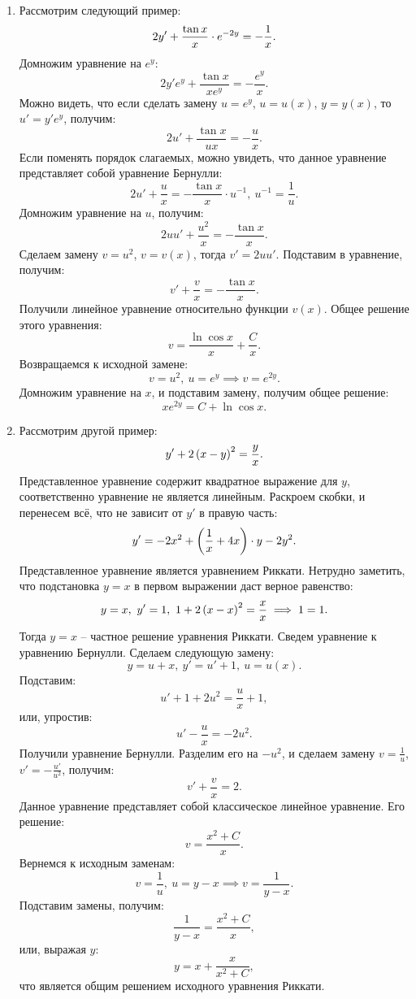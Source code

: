 		\begin{enumerate}
			\item Рассмотрим следующий пример:
				\[ 2y' + \frac{\tan{x}}{x} \cdot e^{-2y} = - \dfrac{1}{x}. \]
				Домножим уравнение на $e^{y}$:
				\[ 2y' e^{y} + \frac{\tan{x}}{x e^{y}} = - \frac{e^{y}}{x}. \]
				Можно видеть, что если сделать замену $u = e^{y}$, $u = u(x)$, $y = y(x)$, то $u' = y' e^{y}$, получим:
				\[ 2u' + \frac{\tan{x}}{ux} = - \frac{u}{x}. \]
				Если поменять порядок слагаемых, можно увидеть, что данное уравнение представляет собой уравнение Бернулли:
				\[ 2u' + \frac{u}{x} = -\frac{\tan{x}}{x} \cdot u^{-1}, ~ u^{-1} = \frac{1}{u}. \]
				Домножим уравнение на $u$, получим:
				\[ 2uu' + \frac{u^2}{x} = - \frac{\tan{x}}{x}. \]
				Сделаем замену $v = u^2$, $v = v(x)$, тогда $v' = 2uu'$. Подставим в уравнение, получим:
				\[ v' + \frac{v}{x} = - \frac{\tan{x}}{x}. \]
				Получили линейное уравнение относительно функции $v(x)$. Общее решение этого уравнения:
				\[ v = \frac{\ln{\cos{x}}}{x} + \frac{C}{x}. \]
				Возвращаемся к исходной замене:
				\[ v = u^2, ~ u = e^{y} \implies v = e^{2y}. \]
				Домножим уравнение на $x$, и подставим замену, получим общее решение:
				\[ xe^{2y} = C + \ln{\cos{x}}. \]

			\item Рассмотрим другой пример:
				\[ y' + 2 \left( x - y \right)^2 = \frac{y}{x}. \]
				Представленное уравнение содержит квадратное выражение для $y$, соответственно уравнение не является линейным. Раскроем скобки, и перенесем всё, что не зависит от $y'$ в правую часть:
				\[ y' = -2x^2 + \left( \frac{1}{x} + 4x \right) \cdot y - 2y^2. \]
				Представленное уравнение является уравнением Риккати. Нетрудно заметить, что подстановка $y = x$ в первом выражении даст верное равенство:
				\[ y = x, ~ y' = 1, ~ 1 + 2 \left( x - x \right)^2 = \frac{x}{x} \implies 1 = 1. \]
				Тогда $y = x$ -- частное решение уравнения Риккати. Сведем уравнение к уравнению Бернулли. Сделаем следующую замену:
				\[ y = u + x, ~ y' = u' + 1, ~ u = u(x). \]
				Подставим:
				\[ u' + 1 + 2 u^2 = \frac{u}{x} + 1, \]
				или, упростив:
				\[ u' - \frac{u}{x} = -2u^2. \]
				Получили уравнение Бернулли. Разделим его на $-u^2$, и сделаем замену $v = \frac{1}{u}$, $v' = - \frac{u'}{u^2}$, получим:
				\[ v' + \frac{v}{x} = 2. \]
				Данное уравнение представляет собой классическое линейное уравнение. Его решение:
				\[ v = \frac{x^2 + C}{x}. \]
				Вернемся к исходным заменам:
				\[ v = \frac{1}{u}, ~ u = y - x \implies v = \frac{1}{y - x}. \]
				Подставим замены, получим:
				\[ \frac{1}{y - x} = \frac{x^2 + C}{x}, \]
				или, выражая $y$:
				\[ y = x + \frac{x}{x^2 + C}, \]
				что является общим решением исходного уравнения Риккати.


\end{enumerate}
